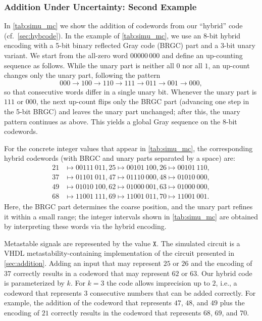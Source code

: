 \documentclass[9pt,journal,compsoc]{IEEEtran}
\theoremstyle{remark}
\newcommand{\mfx}{\mathtt{X}}
\begin{document}
\subsubsection*{Addition Under Uncertainty: Second Example}
% 
In \cref{tab:simu_mc} we show the addition of codewords from our ``hybrid'' code (cf.~\cref{sec:hybcode}).
%
In the example of \cref{tab:simu_mc}, we use an $8$-bit hybrid encoding with a
5-bit binary reflected Gray code (BRGC) part and a $3$-bit unary variant. We start from the all-zero
word $00000\,000$ and define an up-counting sequence as follows. While the unary part is neither all $0$ nor all $1$, an up-count changes only the unary part, following the pattern
\[
000 \to 100 \to 110 \to 111 \to 011 \to 001 \to 000,
\]
so that consecutive words differ in a single unary bit. Whenever the unary part is $111$ or $000$, the next up-count flips only the BRGC
part (advancing one step in the 5-bit BRGC) and leaves the unary part unchanged; after this, the unary pattern continues as above. This yields a global Gray sequence on the $8$-bit codewords.

For the concrete integer values that appear in \cref{tab:simu_mc}, the corresponding hybrid codewords (with BRGC and unary parts separated by
a space) are:
\begin{align*}
21 &\mapsto 00111\ 011,
25 \mapsto 00101\ 100,
26 \mapsto 00101\ 110, \\
37 &\mapsto 01101\ 011,
47 \mapsto 01110\ 000,
48 \mapsto 01010\ 000, \\
49 &\mapsto 01010\ 100,
62 \mapsto 01000\ 001,
63 \mapsto 01000\ 000, \\
68 &\mapsto 11001\ 111,
69 \mapsto 11001\ 011,
70 \mapsto 11001\ 001.
\end{align*}
Here, the BRGC part determines the coarse position, and the unary part refines it within a small range; the integer intervals shown in \cref{tab:simu_mc} are obtained by interpreting these words via the hybrid
encoding.
%

Metastable signals are represented by the value $\mfx$.
The simulated circuit is a VHDL metastability-containing implementation of the circuit presented
  in \cref{sec:addition}. 
Adding an input that may represent $25$ or $26$ and the encoding 
  of $37$ correctly results in a codeword that may represent $62$ or $63$.
Our hybrid code is parameterized by $k$.
For $k=3$ the code allows imprecision up to $2$, i.e., a codeword that 
  represents $3$ consecutive numbers that can be added correctly.
For example, the addition of the codeword that represents $47$, $48$, 
  and $49$ plus the encoding of $21$ correctly results in the 
  codeword that represents $68$, $69$, and $70$.
\end{document}
